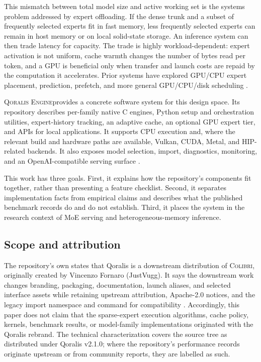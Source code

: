 \documentclass[10pt,twocolumn]{article}
\newcommand{\qoralis}{\textsc{Qoralis Engine}}
\newcommand{\colibri}{\textsc{Colibri}}
\newcommand{\code}[1]{\texttt{\small\detokenize{#1}}}
\begin{document}
This mismatch between total model size and active working set is the systems problem addressed by expert offloading. If the dense trunk and a subset of frequently selected experts fit in fast memory, less frequently selected experts can remain in host memory or on local solid-state storage. An inference system can then trade latency for capacity. The trade is highly workload-dependent: expert activation is not uniform, cache warmth changes the number of bytes read per token, and a GPU is beneficial only when transfer and launch costs are repaid by the computation it accelerates. Prior systems have explored GPU/CPU expert placement, prediction, prefetch, and more general GPU/CPU/disk scheduling \cite{xue2024,sheng2023,song2024}.

\qoralis provides a concrete software system for this design space. Its repository describes per-family native C engines, Python setup and orchestration utilities, expert-history tracking, an adaptive cache, an optional GPU expert tier, and APIs for local applications. It supports CPU execution and, where the relevant build and hardware paths are available, Vulkan, CUDA, Metal, and HIP-related backends. It also exposes model selection, import, diagnostics, monitoring, and an OpenAI-compatible serving surface \cite{qoralisrepo,qoralisreadme}.

This work has three goals. First, it explains how the repository's components fit together, rather than presenting a feature checklist. Second, it separates implementation facts from empirical claims and describes what the published benchmark records do and do not establish. Third, it places the system in the research context of MoE serving and heterogeneous-memory inference.

\subsection{Scope and attribution}
The repository's own \code{UPSTREAM.md} states that Qoralis is a downstream distribution of \colibri, originally created by Vincenzo Fornaro (JustVugg). It says the downstream work changes branding, packaging, documentation, launch aliases, and selected interface assets while retaining upstream attribution, Apache-2.0 notices, and the legacy \code{colibri} import namespace and \code{coli} command for compatibility \cite{upstreamnotice,upstreamrepo}. Accordingly, this paper does not claim that the sparse-expert execution algorithms, cache policy, kernels, benchmark results, or model-family implementations originated with the Qoralis rebrand. The technical characterization covers the source tree as distributed under Qoralis v2.1.0; where the repository's performance records originate upstream or from community reports, they are labelled as such.
\end{document}
